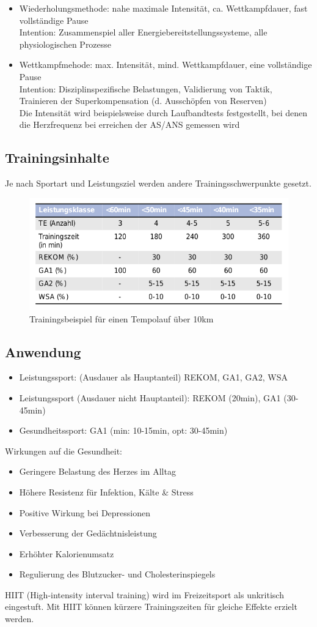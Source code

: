 \begin{itemize}
\item Wiederholungsmethode: nahe maximale Intensität, ca. Wettkampfdauer, fast vollständige Pause\\
    Intention: Zusammenspiel aller Energiebereitstellungssysteme, alle physiologischen Prozesse
\item Wettkampfmehode: max. Intensität, mind. Wettkampfdauer, eine vollständige Pause \\
    Intention: Disziplinspezifische Belastungen, Validierung von Taktik, Trainieren der Superkompensation (d. Ausschöpfen von Reserven)\\
    Die Intensität wird beispielsweise durch Laufbandtests festgestellt, bei denen die Herzfrequenz bei erreichen der AS/ANS gemessen wird
\end{itemize}

\subsection{Trainingsinhalte}
Je nach Sportart und Leistungsziel werden andere Trainingsschwerpunkte gesetzt.
\begin{figure}[H]
    \centering
    \includegraphics[width=.5\textwidth]{pictures/trainingsbeispiel_tempolauf.png}
    \caption{Trainingsbeispiel für einen Tempolauf über 10km}
\end{figure}

\subsection{Anwendung}
\begin{itemize}
    \item Leistungssport: (Ausdauer als Hauptanteil) REKOM, GA1, GA2, WSA
    \item Leistungssport (Ausdauer nicht Hauptanteil): REKOM (20min), GA1 (30-45min)
    \item Gesundheitssport: GA1 (min: 10-15min, opt: 30-45min)
\end{itemize}

Wirkungen auf die Gesundheit:
\begin{itemize}
    \item Geringere Belastung des Herzes im Alltag
    \item Höhere Resistenz für Infektion, Kälte \& Stress
    \item Positive Wirkung bei Depressionen
    \item Verbesserung der Gedächtnisleistung
    \item Erhöhter Kalorienumsatz
    \item Regulierung des Blutzucker- und Cholesterinspiegels
\end{itemize}
HIIT (High-intensity interval training) wird im Freizeitsport als unkritisch eingestuft.
Mit HIIT können kürzere Trainingszeiten für gleiche Effekte erzielt werden.

